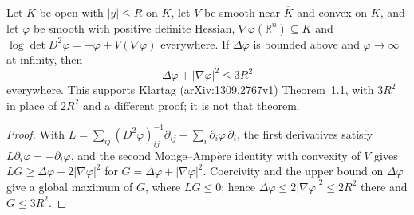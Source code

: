 \begin{lemma}
  \label{lem:moment-potential-laplacian-bound}
  \leanok
  Let $K$ be open with $|y|\le R$ on $K$, let $V$ be smooth near $\overline K$ and convex on $K$, and
  let $\varphi$ be smooth with positive definite Hessian, $\nabla\varphi(\mathbb R^n)\subseteq K$ and
  $\log\det D^2\varphi=-\varphi+V(\nabla\varphi)$ everywhere. If $\Delta\varphi$ is bounded above and
  $\varphi\to\infty$ at infinity, then
  \[
    \Delta\varphi+|\nabla\varphi|^2\le3R^2
  \]
  everywhere. This supports Klartag (arXiv:1309.2767v1) Theorem~1.1, with $3R^2$ in place of $2R^2$
  and a different proof; it is not that theorem.
\end{lemma}
\begin{proof}
  \leanok
  With $L=\sum_{ij}(D^2\varphi)^{-1}_{ij}\partial_{ij}-\sum_i\partial_i\varphi\,\partial_i$, the first
  derivatives satisfy $L\partial_i\varphi=-\partial_i\varphi$, and the second Monge--Amp\`ere identity
  with convexity of $V$ gives $LG\ge\Delta\varphi-2|\nabla\varphi|^2$ for
  $G=\Delta\varphi+|\nabla\varphi|^2$. Coercivity and the upper bound on $\Delta\varphi$ give a global
  maximum of $G$, where $LG\le0$; hence $\Delta\varphi\le2|\nabla\varphi|^2\le2R^2$ there and $G\le3R^2$.
\end{proof}

